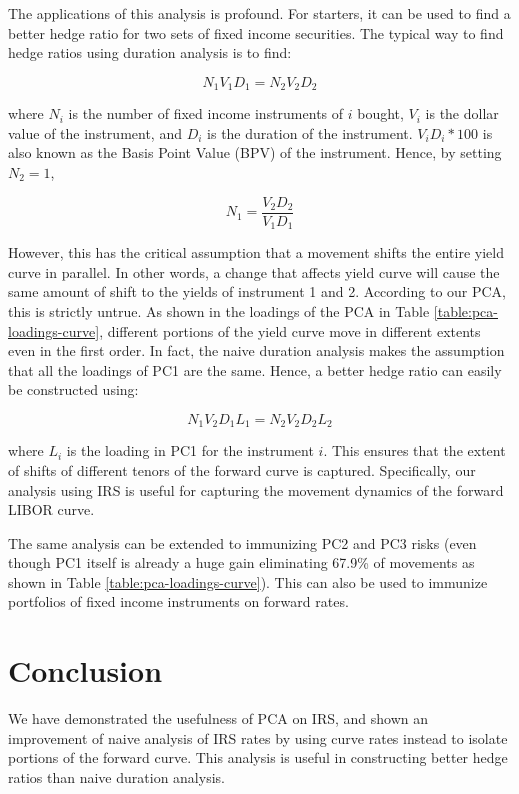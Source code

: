 \documentclass[11pt]{scrreprt}
\begin{document}
The applications of this analysis is profound. For starters, it can be used to find a better hedge ratio for two sets of fixed income securities. The typical way to find hedge ratios using duration analysis is to find:

\[N_1 V_1 D_1 = N_2 V_2 D_2\]

where $N_i$ is the number of fixed income instruments of $i$ bought, $V_i$ is the dollar value of the instrument, and $D_i$ is the duration of the instrument. $V_i D_i * 100$ is also known as the Basis Point Value (BPV) of the instrument. Hence, by setting $N_2 = 1$,

\[N_1 = \frac{V_2 D_2}{V_1 D_1}\]

However, this has the critical assumption that a movement shifts the entire yield curve in parallel. In other words, a change that affects yield curve will cause the same amount of shift to the yields of instrument 1 and 2. According to our PCA, this is strictly untrue. As shown in the loadings of the PCA in Table \ref{table:pca-loadings-curve}, different portions of the yield curve move in different extents even in the first order. In fact, the naive duration analysis makes the assumption that all the loadings of PC1 are the same. Hence, a better hedge ratio can easily be constructed using:

\[N_1 V_2 D_1 L_1 = N_2 V_2 D_2 L_2 \]

where $L_i$ is the loading in PC1 for the instrument $i$. This ensures that the extent of shifts of different tenors of the forward curve is captured. Specifically, our analysis using IRS is useful for capturing the movement dynamics of the forward LIBOR curve.

The same analysis can be extended to immunizing PC2 and PC3 risks (even though PC1 itself is already a huge gain eliminating 67.9\% of movements as shown in Table \ref{table:pca-loadings-curve}). This can also be used to immunize portfolios of fixed income instruments on forward rates.

\chapter{Conclusion}

We have demonstrated the usefulness of PCA on IRS, and shown an improvement of naive analysis of IRS rates by using curve rates instead to isolate portions of the forward curve. This analysis is useful in constructing better hedge ratios than naive duration analysis.

\begin{appendices}

\end{appendices}
\end{document}
